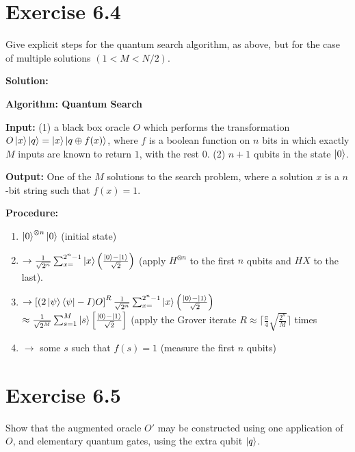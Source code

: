 \documentclass{book}
\begin{document}
\section*{Exercise 6.4}
    Give explicit steps for the quantum search algorithm, as above, but for the case of multiple solutions $(1<M<N/2)$.
    
    \textbf{Solution:} 
    
    \textbf{Algorithm: Quantum Search} \par
    \textbf{Input:} (1) a black box oracle $O$ which performs the transformation $O\ket{x}\ket{q}=\ket{x}\ket{q\oplus f(x)}$, where $f$ is a boolean function on $n$ bits in which exactly $M$ inputs are known to return $1$, with the rest 0. (2) $n+1$ qubits in the state $\ket{0}$. \par
    
    \textbf{Output:} One of the $M$ solutions to the search problem, where a solution $x$ is a $n$-bit string such that $f(x) = 1$. \par
    
    \textbf{Procedure:}\par
    \begin{enumerate}
        \item $\ket{0}^{\otimes n}\ket{0}$ (initial state)
        \item $\rightarrow \frac{1}{\sqrt{2^n}} \sum_{x=}^{2^n-1} \ket{x} \left(\frac{\ket{0}-\ket{1}}{\sqrt{2}}\right)$ (apply $H^{\otimes n}$ to the first $n$ qubits and $HX$ to the last). 
        \item $\rightarrow \left[(2\ket{\psi}\bra{\psi}-I)O\right]^R \frac{1}{\sqrt{2^n}} \sum_{x=}^{2^n-1} \ket{x} \left(\frac{\ket{0}-\ket{1}}{\sqrt{2}}\right)$ \\
        $\approx \frac{1}{\sqrt{2^M}}\sum_{s=1}^M \ket{s} \left[\frac{\ket{0}-\ket{1}}{\sqrt{2}}\right]$ (apply the Grover iterate $R\approx \lceil\frac{\pi}{4}\sqrt{\frac{2^n}{M}}\rceil$ times
        \item $\rightarrow$ some $s$ such that $f(s) = 1$ (measure the first $n$ qubits)
    \end{enumerate}
    
    \section*{Exercise 6.5}
        Show that the augmented oracle $O'$ may be constructed using one application of $O$, and elementary quantum gates, using the extra qubit $\ket{q}$.
        
\end{document}
